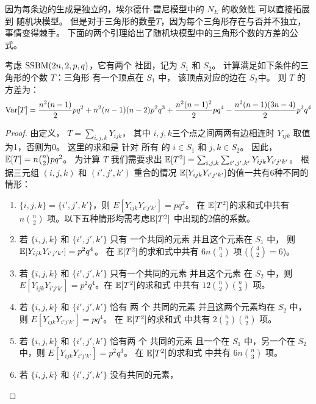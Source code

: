 因为每条边的生成是独立的，埃尔德什-雷尼模型中的
$N_E$ 的收敛性 %
可以直接拓展到
随机块模型。
但是对于三角形的数量$T$，因为每个三角形存在与否并不独立，事情变得棘手。
下面的两个引理给出了随机块模型中的三角形个数的方差的公式。
\begin{lemma}\label{lem:SBM_tr_counting_cross}
	考虑 $\operatorname{SSBM}(2n, 2, p, q)$，它有两个
  社团，记为 $S_1$ 和 $S_2$。
    计算满足如下条件的三角形的个数 $T$：三角形
    有一个顶点在  $S_1$ 中，
    该顶点对应的边在 $S_2$中。
   则 $T$ 的方差为：
\begin{align}
\operatorname{\mathrm{Var}}[T]  = \frac{n^2(n-1)}{2}pq^2 + n^2(n-1)(n-2)p^2q^3 
 + \frac{n^2(n-1)^2}{2}pq^4 - \frac{n^2(n-1)(3n-4)}{2} p^2 q^4
 \label{eq:SBM_tr_counting_cross}
\end{align}
\end{lemma}
\begin{proof}
	由定义， $T=\sum_{i,j,k} Y_{ijk}$，
  其中 $i,j,k$三个点之间两两有边相连时 $Y_{ijk}$ 取值为1，否则为0。
  这里的求和是
  针对 所有 的 $i \in S_1$ 和 $j,k \in S_2$。
  因此， $\operatorname{\mathbb{E}}[T] = n\binom{n}{2}pq^2$。
	为计算 $T$ 我们需要求出 $\operatorname{\mathbb{E}}[T^2] = \sum_{i,j,k}\sum_{i',j',k'} Y_{ijk}Y_{i'j'k'}$。
	根据三元组 $(i,j,k)$ 和 $(i',j',k')$ 重合的情况
  $\operatorname{\mathbb{E}}[Y_{ijk}Y_{i'j'k'}]$的值一共有6种不同的情形：
	\begin{enumerate}
		\item $\{i,j,k\} = \{i',j',k'\}$，则 $E[Y_{ijk}Y_{i'j'k'}] = pq^2$。
		在 $\operatorname{\mathbb{E}}[T^2]$的求和式中共有 $n\binom{n}{2}$ 
     项。以下五种情形均需考虑$\operatorname{\mathbb{E}}[T^2]$ 中出现的2倍的系数。
		\item 若 $\{i,j,k\}$ 和 $\{i',j',k'\}$ 只有
    一个共同的元素
    并且这个元素在 $ S_1$ 中， 则 $\operatorname{\mathbb{E}}[Y_{ijk}Y_{i'j'k'}] = p^2q^4$。
		在 $\operatorname{\mathbb{E}}[T^2]$的求和式中共有 $6n\binom{n}{4}$ 项 ($\binom{4}{2}=6$)。
		\item 若 $\{i,j,k\}$ 和 $\{i',j',k'\}$ 只有一个共同的元素
    并且这个元素 在 $ S_2$ 中，则
    $E[Y_{ijk}Y_{i'j'k'}] = p^2q^4$。在 $\operatorname{\mathbb{E}}[T^2]$的求和式
		中共有 $12\binom{n}{2}\binom{n}{3}$ 项。
		\item 若 $\{i,j,k\}$ 和 $\{i',j',k'\}$ 恰有 两  个 共同的元素
    并且这两个元素均在 $S_2$ 中，
    则 $E[Y_{ijk}Y_{i'j'k'}] = pq^4$。
    在 $\operatorname{\mathbb{E}}[T^2]$的求和式
		中共有  $2\binom{n}{2}\binom{n}{2}$ 项。
\item 若 $\{i,j,k\}$ 和 $\{i',j',k'\}$ 恰有两  个 共同的元素
且一个在 $S_1$ 中，另一个在 $S_2$ 中，则 $E[Y_{ijk}Y_{i'j'k'}] = p^2q^3$。
在 $\operatorname{\mathbb{E}}[T^2]$的求和式
		中共有 $6n\binom{n}{3}$ 项。
\item  若 $\{i,j,k\}$ 和 $\{i',j',k'\}$ 没有共同的元素，

\end{enumerate}
\end{proof}
